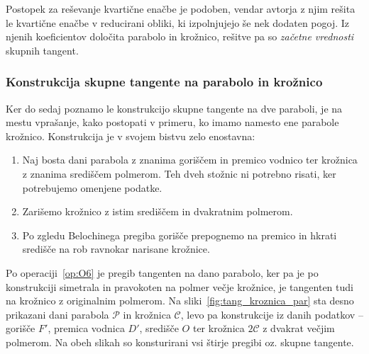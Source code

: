 Postopek za reševanje kvartične enačbe je podoben, vendar avtorja z njim rešita le kvartične enačbe v reducirani obliki, ki izpolnjujejo še nek dodaten pogoj. Iz njenih koeficientov določita parabolo in krožnico, rešitve pa so \emph{začetne vrednosti} skupnih tangent.

\subsubsection*{Konstrukcija skupne tangente na parabolo in krožnico}

Ker do sedaj poznamo le konstrukcijo skupne tangente na dve paraboli, je na mestu vprašanje, kako postopati v primeru, ko imamo namesto ene parabole krožnico. Konstrukcija je v svojem bistvu zelo enostavna:
\begin{enumerate}
    \item Naj bosta dani parabola z znanima goriščem in premico vodnico ter krožnica z znanima središčem polmerom. Teh dveh stožnic ni potrebno risati, ker potrebujemo omenjene podatke.
    \item Zarišemo krožnico z istim središčem in dvakratnim polmerom.
    \item Po zgledu Belochinega pregiba gorišče prepognemo na premico in hkrati središče na rob ravnokar narisane krožnice.
\end{enumerate}

Po operaciji~\ref{op:O6} je pregib tangenten na dano parabolo, ker pa je po konstrukciji simetrala in pravokoten na polmer večje krožnice, je tangenten tudi na krožnico z originalnim polmerom. Na sliki~\ref{fig:tang_kroznica_par} sta desno prikazani dani parabola $\mathcal{P}$ in krožnica $\mathcal{C}$, levo pa konstrukcije iz danih podatkov -- gorišče $F'$, premica vodnica $D'$, središče $O$ ter krožnica $2\mathcal{C}$ z dvakrat večjim polmerom. Na obeh slikah so konsturirani vsi štirje pregibi oz. skupne tangente.

